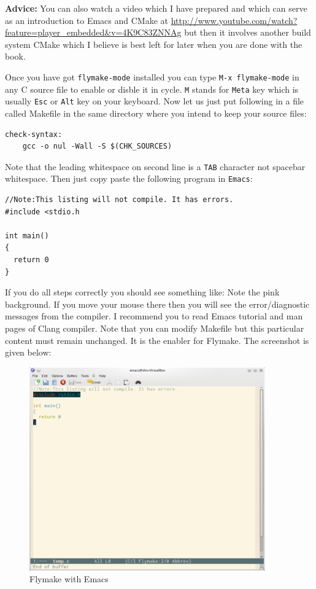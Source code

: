 \textbf{Advice:} You can also watch a video which I have prepared and which can
serve as an introduction to Emacs and CMake at
\url{http://www.youtube.com/watch?feature=player_embedded&v=4K9C83ZNNAg} but
then it involves another build system CMake which I believe is best left for
later when you are done with the book.

Once you have got \texttt{flymake-mode} installed you can type \texttt{M-x
  flymake-mode} in any C source file to enable or disble it in
cycle. \texttt{M} stands for \texttt{Meta} key which is usually \texttt{Esc} or
\texttt{Alt} key on your keyboard. Now let us just put following in a file
called Makefile in the same directory where you intend to keep your source
files:

\begin{verbatim}
check-syntax:
    gcc -o nul -Wall -S $(CHK_SOURCES)
\end{verbatim}


Note that the leading whitespace on second line is a \texttt{TAB} character not
spacebar whitespace. Then just copy paste the following program in
\texttt{Emacs}:

\begin{verbatim}
//Note:This listing will not compile. It has errors.
#include <stdio.h

int main()
{
  return 0
}
\end{verbatim}

If you do all steps correctly you should see something like: Note the pink
background. If you move your mouse there then you will see the error/diagnostic
messages from the compiler. I recommend you to read Emacs tutorial and
man pages of Clang compiler. Note that you can modify Makefile but this
particular content must remain unchanged. It is the enabler for Flymake. The
screenshot is given below:

\begin{figure}[t!]
\begin{center}
\includegraphics[width=4in]{figs/flymake.pdf}
\end{center}
\caption{Flymake with Emacs}
\end{figure}

